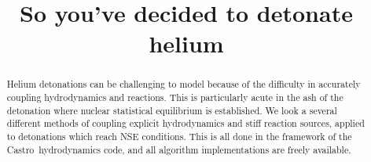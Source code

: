 \documentclass[times,modern]{aastex62}
\newcommand{\castro}{{\sf Castro}}
\begin{document}

\title{So you've decided to detonate helium}

\shortauthors{}








\begin{abstract}
Helium detonations can be challenging to model because of the
difficulty in accurately coupling hydrodynamics and reactions.  This
is particularly acute in the ash of the detonation where nuclear
statistical equilibrium is established.  We look a several different
methods of coupling explicit hydrodynamics and stiff reaction sources,
applied to detonations which reach NSE conditions.  This is all done
in the framework of the \castro\ hydrodynamics code, and all algorithm
implementations are freely available.
\end{abstract}


\end{document}
